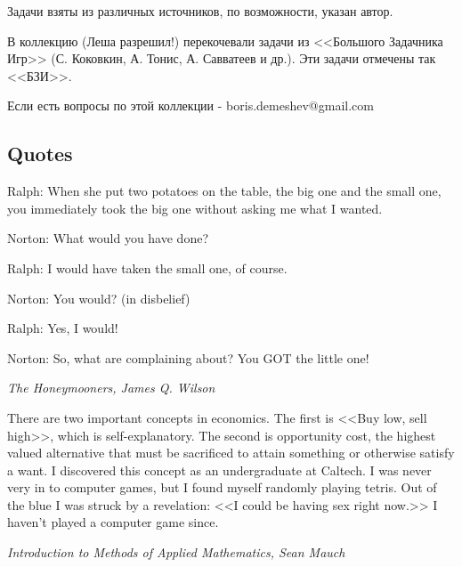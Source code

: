 
Задачи взяты из различных источников, по возможности, указан автор. 

В коллекцию (Леша разрешил!) перекочевали задачи из <<Большого Задачника Игр>> (С. Коковкин, А. Тонис, А. Савватеев и др.). Эти задачи отмечены так <<БЗИ>>.

Если есть вопросы по этой коллекции - boris.demeshev@gmail.com





\subsection{Quotes}

Ralph: When she put two potatoes on the table, the big one and the small one, you immediately took the big one without asking me what I wanted.\par
Norton: What would you have done?\par
Ralph: I would have taken the small one, of course.\par
Norton: You would? (in disbelief)\par
Ralph: Yes, I would!\par
Norton: So, what are complaining about? You GOT the little one!\par
{\it The Honeymooners, James Q. Wilson}\par

There are two important concepts in economics. The first is <<Buy low, sell high>>, which is self-explanatory. The second is opportunity cost, the highest valued alternative that must be sacrificed to attain something or otherwise satisfy a want. I discovered this concept as an undergraduate at Caltech. I was never very in to computer games, but I found myself randomly playing tetris. Out of the blue I was struck by a revelation: <<I could be having sex right now.>> I haven't played a computer game since.\par
{\it Introduction to Methods of Applied Mathematics, Sean Mauch}\par

